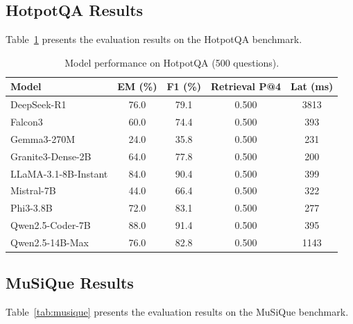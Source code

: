 \documentclass[12pt,a4paper]{article}
\begin{document}
\subsection{HotpotQA Results}
\label{subsec:hotpotqa_results}

Table~\ref{tab:hotpotqa} presents the evaluation results on the
HotpotQA benchmark.

\begin{table}[htbp]
  \centering
  \caption{Model performance on HotpotQA (500 questions).}
  \label{tab:hotpotqa}
  \begin{tabular}{lcccc}
    \hline
    \textbf{Model}
      & \textbf{EM (\%)}
      & \textbf{F1 (\%)}
      & \textbf{Retrieval P@4}
      & \textbf{Lat (ms)} \\
    \hline
    DeepSeek-R1            & 76.0 & 79.1 & 0.500 & 3813 \\
    Falcon3                & 60.0 & 74.4 & 0.500 &  393 \\
    Gemma3-270M            & 24.0 & 35.8 & 0.500 &  231 \\
    Granite3-Dense-2B      & 64.0 & 77.8 & 0.500 &  200 \\
    LLaMA-3.1-8B-Instant   & 84.0 & 90.4 & 0.500 &  399 \\
    Mistral-7B             & 44.0 & 66.4 & 0.500 &  322 \\
    Phi3-3.8B              & 72.0 & 83.1 & 0.500 &  277 \\
    Qwen2.5-Coder-7B       & 88.0 & 91.4 & 0.500 &  395 \\
    Qwen2.5-14B-Max        & 76.0 & 82.8 & 0.500 & 1143 \\
    \hline
  \end{tabular}
\end{table}

\subsection{MuSiQue Results}
\label{subsec:musique_results}

Table~\ref{tab:musique} presents the evaluation results on the
MuSiQue benchmark.
\end{document}

